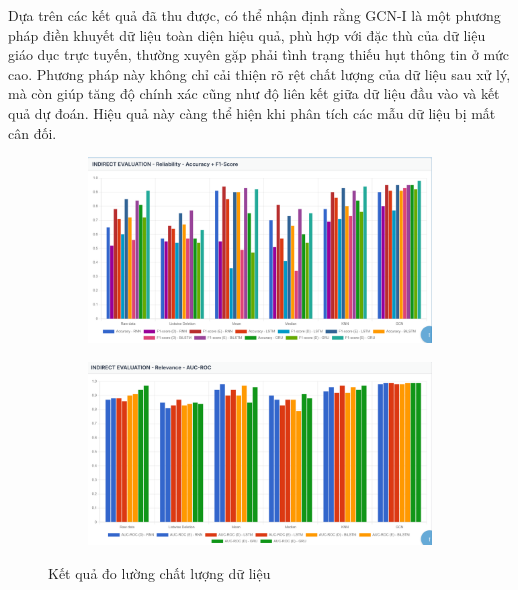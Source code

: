 Dựa trên các kết quả đã thu được, có thể nhận định rằng GCN-I là một phương pháp điền khuyết dữ liệu toàn diện hiệu quả, phù hợp với đặc thù của dữ liệu giáo dục trực tuyến, thường xuyên gặp phải tình trạng thiếu hụt thông tin ở mức cao. Phương pháp này không chỉ cải thiện rõ rệt chất lượng của dữ liệu sau xử lý, mà còn giúp tăng độ chính xác cũng như độ liên kết giữa dữ liệu đầu vào và kết quả dự đoán. Hiệu quả này càng thể hiện khi phân tích các mẫu dữ liệu bị mất cân đối.

\begin{figure}[H]
    \centering
    \begin{subfigure}[b]{0.45\textwidth}
        \centering
        \includegraphics[width=\textwidth]{imgs/demo-indirect.png}
        \label{fig:sub1}
    \end{subfigure}
    \hfill
    \begin{subfigure}[b]{0.45\textwidth}
        \centering
        \includegraphics[width=\textwidth]{imgs/demo-indirect-aucroc.png}
        \label{fig:sub2}
    \end{subfigure}
    \caption{Kết quả đo lường chất lượng dữ liệu}
    \label{fig:2images}
\end{figure}


